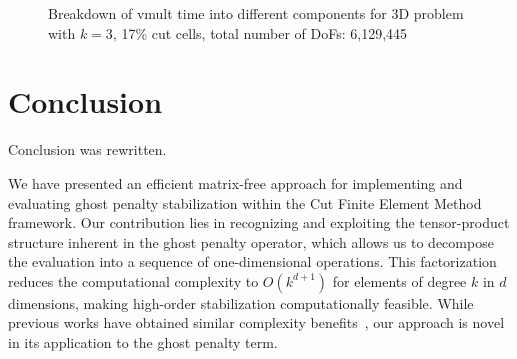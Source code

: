 \documentclass[11pt,a4paper]{article}
\begin{document}
\begin{figure}[!ht]
    \centering
    \caption{Breakdown of vmult time into different components for 3D problem with  $k=3$, 17\% cut  cells, total
        number of DoFs: 6,129,445 }
    \label{fig:vmult_time_breakdown}
\end{figure}

\section{Conclusion}
\label{sec:conclusion}

Conclusion was rewritten.

We have presented an efficient matrix-free approach for implementing and evaluating ghost penalty stabilization within
the Cut Finite Element Method framework. Our contribution lies in recognizing and exploiting the tensor-product
structure inherent in the ghost penalty operator, which allows us to decompose the evaluation into a sequence of
one-dimensional operations. This factorization reduces the computational complexity to $O(k^{d+1})$ for elements of
degree $k$ in $d$ dimensions, making high-order stabilization computationally feasible. While previous works have
obtained similar complexity benefits~\cite{bergbauer2024high}, our approach is novel in its application to the ghost
penalty term.
\end{document}
